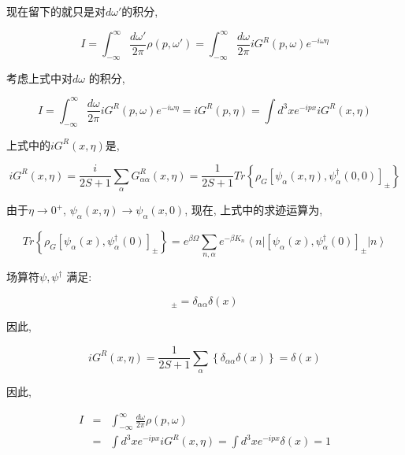 现在留下的就只是对$d\omega'$的积分,

\begin{equation*}
I = \int_{-\infty}^{\infty} \frac{d \omega'}{2 \pi} \rho (p,
\omega') = \int_{-\infty}^{\infty}\frac{d \omega}{2 \pi} i G^R (p,
\omega) e^{-i \omega \eta}
\end{equation*}

考虑上式中对$d \omega$ 的积分,

\begin{equation*}
I = \int_{-\infty}^{\infty}\frac{d \omega}{2 \pi} i G^R (p, \omega)
e^{-i \omega \eta} = i G^R(p, \eta)=  \int d^3 x e^{-i px} i G^R (x,
\eta)
\end{equation*}

上式中的$iG^R(x, \eta)$是,

\begin{equation*}
i G^R (x, \eta) = \frac{i}{2S+1} \sum_{\alpha} G_{\alpha
\alpha}^R(x, \eta) = \frac{1}{2S+1} Tr \left\{\rho_G [\psi_\alpha
(x, \eta), \psi_\alpha^\dagger (0,0)]_{\pm} \right\}
\end{equation*}

由于$\eta \to 0^+$, $\psi_\alpha(x,\eta) \to \psi_\alpha(x,0)$,
现在, 上式中的求迹运算为,

\begin{equation*}
Tr \left\{\rho_G [\psi_\alpha (x), \psi_\alpha^\dagger (0)]_{\pm}
\right\} = e^{\beta \Omega} \sum_{n, \alpha} e^{-\beta K_n}
\left\langle n \right| [\psi_\alpha (x), \psi_\alpha^\dagger
(0)]_{\pm} \left| n \right\rangle
\end{equation*}

场算符$\psi, \psi^\dagger$ 满足:

\begin{equation*}
[\psi_\alpha (x), \psi_\alpha^\dagger (0)]_{\pm} = \delta_{\alpha
\alpha} \delta (x)
\end{equation*}

因此,

\begin{equation*}
iG^R (x, \eta) =\frac{1}{2S+1} \sum_\alpha \left\{ \delta_{\alpha
\alpha} \delta(x) \right\} = \delta (x)
\end{equation*}

因此,

\begin{eqnarray*}
  I &=& \int_{-\infty}^{\infty} \frac{d \omega}{2 \pi} \rho(p, \omega) \\
  & = & \int d^3 x e^{-i px} i G^R (x, \eta) = \int d^3 x e^{-i px} \delta(x) = 1
\end{eqnarray*}

